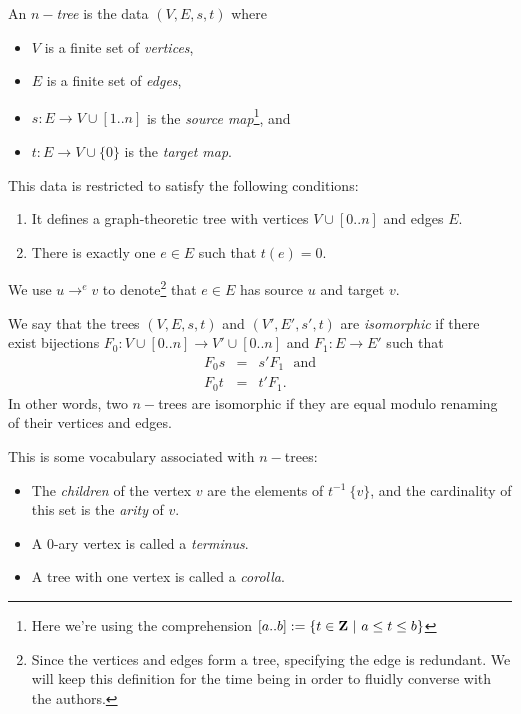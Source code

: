 
\begin{defn}\label{def-tree}
	An $n-$\emph{tree} is the data $(V, E, s, t)$ where
	\begin{itemize}
		\item $V$ is a finite set of \emph{vertices},
		\item $E$ is a finite set of \emph{edges},
		\item $s : E \to V \cup [1..n]$ is the
			\emph{source map}\footnote{Here we're using the
			comprehension $[a..b] :=
			\{t \in \mathbf{Z} \ | \ a \leq t \leq b\}$}, and
		\item $t : E \to V \cup \{0\}$ is the \emph{target map}.
	\end{itemize}
	This data is restricted to satisfy the following conditions:
	\begin{enumerate}
		\item It defines a graph-theoretic tree with vertices
			$V \cup [0..n]$ and edges $E$.
		\item There is exactly one $e \in E$ such that $t(e) = 0$.
	\end{enumerate}
	We use $u \to^{e} v$ to denote\footnote{Since the vertices and
	edges form a tree,  specifying the edge is redundant. We will keep
	this definition for the time being in order to fluidly converse
	with the authors.} that $e \in E$ has source $u$ and target $v$.
\end{defn}

\begin{defn}\label{tree-iso}
	We say that the trees $(V,E,s,t)$ and $(V',E',s',t)$ are
	\emph{isomorphic} if there exist bijections $F_0 : V \cup [0..n]
	\to V' \cup [0..n]$ and $F_1 : E \to E'$ such that
	\begin{eqnarray}
		F_0 s &=& s' F_1 \ \ \ \text{and} \\
		F_0 t &=& t' F_1.
	\end{eqnarray}
	In other words, two $n-$trees are isomorphic if they are equal
	modulo renaming of their vertices and edges.
\end{defn}

\begin{defn}\label{tree-v}
	This is some vocabulary associated with $n-$trees:
	\begin{itemize}
		\item The \emph{children} of the vertex $v$ are the
			elements of $t^{-1} \ \{ v \}$, and the cardinality
			of this set is the \emph{arity} of $v$.
		\item A 0-ary vertex is called a \emph{terminus}.
		\item A tree with one vertex is called a \emph{corolla}.
	\end{itemize}
\end{defn}

